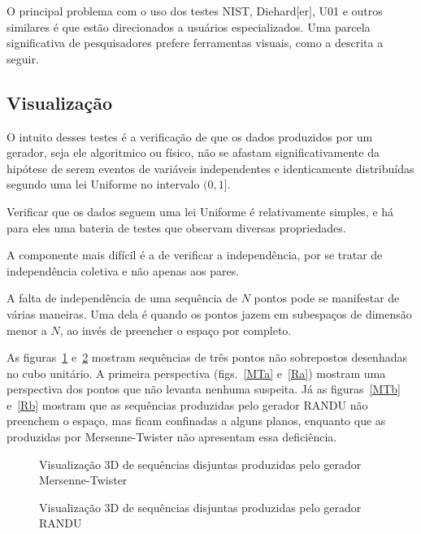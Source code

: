 O principal problema com o uso dos testes NIST, Diehard$[$er$]$, U01 e outros similares é que estão direcionados a usuários especializados.
Uma parcela significativa de pesquisadores prefere ferramentas visuais, como a descrita a seguir.

\subsection{Visualização}

O intuito desses testes é a verificação de que os dados produzidos por um gerador, seja ele algoritmico ou físico, não se afastam significativamente da hipótese de serem eventos de variáveis independentes e identicamente distribuídas segundo uma lei Uniforme no intervalo $(0,1]$.

Verificar que os dados seguem uma lei Uniforme é relativamente simples, e há para eles uma bateria de testes que observam diversas propriedades.

A componente mais difícil é a de verificar a independência, por se tratar de independência coletiva e não apenas aos pares.

A falta de independência de uma sequência de $N$ pontos pode se manifestar de várias maneiras.
Uma dela é quando os pontos jazem em subespaços de dimensão menor a $N$, ao invés de preencher o espaço por completo.

As figuras~\ref{fig:3DMT} e~\ref{fig:3DRandu} mostram sequências de três pontos não sobrepostos desenhadas no cubo unitário.
A primeira perspectiva (figs.~\ref{MTa} e~\ref{Ra}) mostram uma perspectiva dos pontos que não levanta nenhuma suspeita.
Já as figuras~\ref{MTb} e~\ref{Rb} mostram que as sequências produzidas pelo gerador RANDU não preenchem o espaço, mas ficam confinadas a alguns planos, enquanto que as produzidas por Mersenne-Twister não apresentam essa deficiência.

\begin{figure}[hbt]
\centering
{}
\caption{Visualização 3D de sequências disjuntas produzidas pelo gerador Mersenne-Twister}\label{fig:3DMT}
\end{figure}

\begin{figure}[hbt]
\centering
{}
\caption{Visualização 3D de sequências disjuntas produzidas pelo gerador RANDU}\label{fig:3DRandu}
\end{figure}

